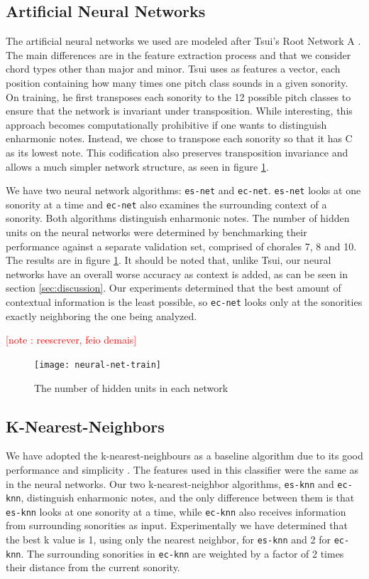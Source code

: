 \documentclass{article}
\newcounter{notecounter}
\newcommand{\note}[1]{
  \addtocounter{notecounter}{1}
  \textcolor{red}{[note \arabic{notecounter}: #1]}
}
\begin{document}
\subsection{Artificial Neural Networks}
\label{sec:neural-net}


The artificial neural networks we used are modeled after Tsui's Root
Network A \cite{tsui:harmonic}. The main differences are in the
feature extraction process and that we consider chord types other than
major and minor. Tsui uses as features a vector, each position
containing how many times one pitch class sounds in a given
sonority. On training, he first transposes each sonority to the 12
possible pitch classes to ensure that the network is invariant under
transposition. While interesting, this approach becomes
computationally prohibitive if one wants to distinguish enharmonic
notes. Instead, we chose to transpose each sonority so that it has C
as its lowest note. This codification also preserves transposition
invariance and allows a much simpler network structure, as seen in
figure \ref{fig:hidden-units}.

We have two neural network algorithms: \texttt{es-net} and
\texttt{ec-net}.  \texttt{es-net} looks at one sonority at a time and
\texttt{ec-net} also examines the surrounding context of a
sonority. Both algorithms distinguish enharmonic notes. The number of
hidden units on the neural networks were determined by benchmarking
their performance against a separate validation set, comprised of
chorales 7, 8 and 10. The results are in figure
\ref{fig:hidden-units}. It should be noted that, unlike Tsui, our
neural networks have an overall worse accuracy as context is added, as
can be seen in section \ref{sec:discussion}. Our experiments
determined that the best amount of contextual information is the least
possible, so \texttt{ec-net} looks only at the sonorities exactly
neighboring the one being analyzed. \note{reescrever, feio demais}

\begin{figure}
  \centering
  \texttt{[image: neural-net-train]}
  \caption{The number of hidden units in each network}
  \label{fig:hidden-units}
\end{figure}


\subsection{K-Nearest-Neighbors}
\label{sec:knn}

We have adopted the k-nearest-neighbours as a baseline algorithm due
to its good performance and simplicity \cite{fix.ea:important,
  gomez.ea:estimating}. The features used in this classifier were the
same as in the neural networks. Our two k-nearest-neighbor algorithms,
\texttt{es-knn} and \texttt{ec-knn}, distinguish enharmonic notes, and
the only difference between them is that \texttt{es-knn} looks at one
sonority at a time, while \texttt{ec-knn} also receives information
from surrounding sonorities as input. Experimentally we have
determined that the best k value is 1, using only the nearest
neighbor, for \texttt{es-knn} and 2 for \texttt{ec-knn}. The
surrounding sonorities in \texttt{ec-knn} are weighted by a factor of
2 times their distance from the current sonority.
\end{document}

